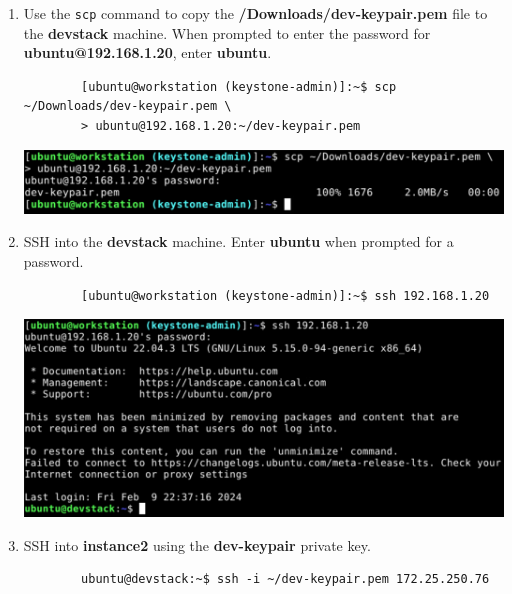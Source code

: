 \documentclass[letterpaper, 12pt]{article}
\begin{document}
\begin{enumerate}
    \item Use the \texttt{scp} command to copy the \textbf{\texttildemid/Downloads/dev-keypair.pem} file to
    the \textbf{devstack} machine. When prompted to enter the password for \textbf{ubuntu@192.168.1.20}, enter
    \textbf{ubuntu}.
    \begin{lstlisting}
        [ubuntu@workstation (keystone-admin)]:~$ scp ~/Downloads/dev-keypair.pem \
        > ubuntu@192.168.1.20:~/dev-keypair.pem
    \end{lstlisting}

    \begin{center}
        \includegraphics[width=\linewidth]{images/part3/step8.png}
    \end{center}

    \item SSH into the \textbf{devstack} machine. Enter \textbf{ubuntu} when prompted for a password.
    \begin{lstlisting}
        [ubuntu@workstation (keystone-admin)]:~$ ssh 192.168.1.20
    \end{lstlisting}

    \begin{center}
        \includegraphics[width=\linewidth]{images/part3/step9.png}
    \end{center}

    \item SSH into \textbf{instance2} using the \textbf{dev-keypair} private key.
    \begin{lstlisting}
        ubuntu@devstack:~$ ssh -i ~/dev-keypair.pem 172.25.250.76
    \end{lstlisting}


\end{enumerate}
\end{document}
